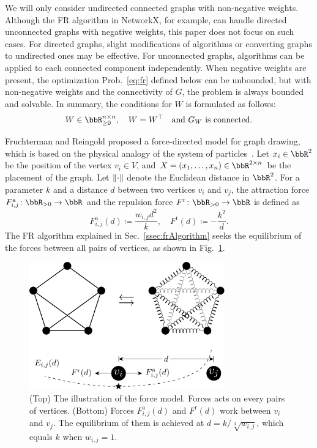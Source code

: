 \documentclass[dvipdfmx,10pt,journal,compsoc]{IEEEtran}
\newcommand{\defeq}{\coloneqq}
\begin{document}
We will only consider undirected connected graphs with non-negative weights.
Although the FR algorithm in NetworkX, for example, can handle directed unconnected graphs with negative weights, this paper does not focus on such cases.
For directed graphs, slight modifications of algorithms or converting graphs to undirected ones may be effective.
For unconnected graphs, algorithms can be applied to each connected component independently.
When negative weights are present, the optimization Prob.~\eqref{eq:fr} defined below can be unbounded, but with non-negative weights and the connectivity of $G$, the problem is always bounded and solvable.
In summary, the conditions for $W$ is formulated as follows:
\begin{equation}\label{eq:WCondition}
  W \in \bbR_{\geq 0}^{n \times n}, \quad W = W^\top \quad \text{and $G_W$ is connected}.
\end{equation}

Fruchterman and Reingold proposed a force-directed model for graph drawing, which is based on the physical analogy of the system of particles~\cite{fruchtermanGraphDrawingForcedirected1991}.
Let $x_i \in \bbR^2$ be the position of the vertex $v_i \in V$, and $X = (x_1, \dots, x_n) \in \bbR^{2 \times n}$ be the placement of the graph.
Let $\norm{\cdot}$ denote the Euclidean distance in $\bbR^2$. For a parameter $k$ and a distance $d$ between two vertices $v_i$ and $v_j$, the attraction force $F_{i,j}^\mathrm{a}\colon \bbR_{> 0} \to \bbR$ and the repulsion force $F^\mathrm{r}\colon \bbR_{> 0} \to \bbR$ is defined as
\begin{equation*}
  F_{i,j}^\mathrm{a}(d) \defeq \frac{w_{i,j} d^2}{k}, \quad F^\mathrm{r}(d) \defeq -\frac{k^2}{d}.
\end{equation*}
The FR algorithm explained in Sec.~\ref{ssec:frAlgorithm} seeks the equilibrium of the forces between all pairs of vertices, as shown in Fig.~\ref{fig:frLayout}.

\begin{figure}[t]
  \centering
  \includegraphics[height=5.5cm]{fr_layout/fr_layout.pdf}
  \caption{
    (Top) The illustration of the force model. Forces acts on every pairs of vertices.
    (Bottom) Forces $F_{i,j}^\mathrm{a}(d)$ and $F^\mathrm{r}(d)$ work between $v_i$ and $v_j$. The equilibrium of them is achieved at $d = k/\sqrt[3]{w_{i,j}}$, which equals $k$ when $w_{i,j} = 1$.
  }
  \label{fig:frLayout}
\end{figure}
\end{document}
